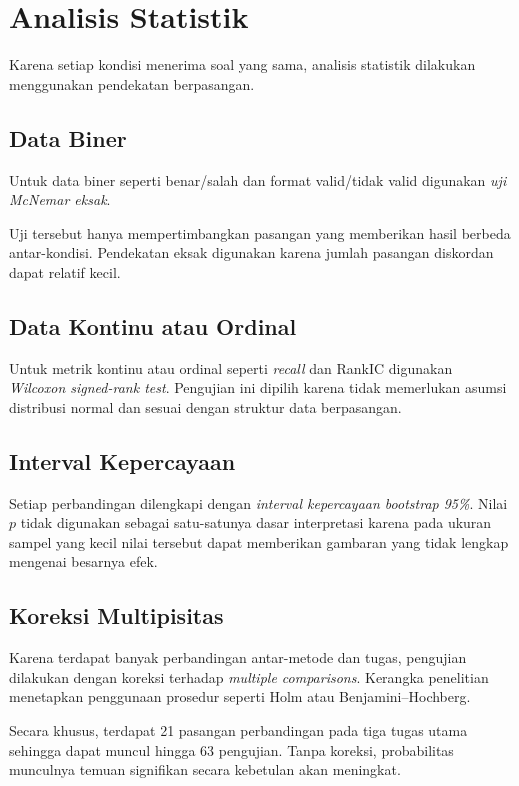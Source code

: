 \section{Analisis Statistik}

Karena setiap kondisi menerima soal yang sama, analisis statistik dilakukan menggunakan pendekatan berpasangan.

\subsection{Data Biner}

Untuk data biner seperti benar/salah dan format valid/tidak valid digunakan \textit{uji McNemar eksak}.

Uji tersebut hanya mempertimbangkan pasangan yang memberikan hasil berbeda antar-kondisi. Pendekatan eksak digunakan karena jumlah pasangan diskordan dapat relatif kecil.

\subsection{Data Kontinu atau Ordinal}

Untuk metrik kontinu atau ordinal seperti \textit{recall} dan RankIC digunakan \textit{Wilcoxon signed-rank test}. Pengujian ini dipilih karena tidak memerlukan asumsi distribusi normal dan sesuai dengan struktur data berpasangan.

\subsection{Interval Kepercayaan}

Setiap perbandingan dilengkapi dengan \textit{interval kepercayaan bootstrap 95\%}. Nilai \(p\) tidak digunakan sebagai satu-satunya dasar interpretasi karena pada ukuran sampel yang kecil nilai tersebut dapat memberikan gambaran yang tidak lengkap mengenai besarnya efek.

\subsection{Koreksi Multipisitas}

Karena terdapat banyak perbandingan antar-metode dan tugas, pengujian dilakukan dengan koreksi terhadap \textit{multiple comparisons}. Kerangka penelitian menetapkan penggunaan prosedur seperti Holm atau Benjamini–Hochberg.

Secara khusus, terdapat 21 pasangan perbandingan pada tiga tugas utama sehingga dapat muncul hingga 63 pengujian. Tanpa koreksi, probabilitas munculnya temuan signifikan secara kebetulan akan meningkat.

